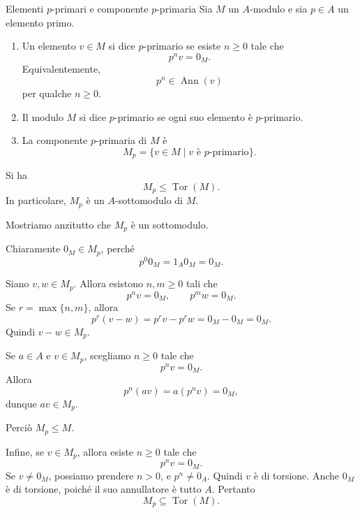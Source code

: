 \documentclass[a4paper]{article}
\begin{document}
\begin{radioactive}
\begin{snippetdefinition}{Elementi \(p\)-primari e componente \(p\)-primaria}
    Sia \(M\) un \(A\)-modulo e sia \(p\in A\) un elemento primo.

    \begin{enumerate}
        \item Un elemento \(v\in M\) si dice \(p\)-primario se esiste \(n\geq 0\) tale che
        \[
            p^n v=0_M.
        \]
        Equivalentemente,
        \[
            p^n\in \operatorname{Ann}(v)
        \]
        per qualche \(n\geq 0\).

        \item Il modulo \(M\) si dice \(p\)-primario se ogni suo elemento è \(p\)-primario.

        \item La componente \(p\)-primaria di \(M\) è
        \[
            M_p
            =
            \{v\in M\mid v \text{ è } p\text{-primario}\}.
        \]
    \end{enumerate}
\end{snippetdefinition}
\end{radioactive}

\begin{radioactive}
\begin{snippetlemma}{}
    Si ha
    \[
        M_p\leq \operatorname{Tor}(M).
    \]
    In particolare, \(M_p\) è un \(A\)-sottomodulo di \(M\).
\end{snippetlemma}
\end{radioactive}

\begin{radioactive}
\begin{snippetproof}{}
    Mostriamo anzitutto che \(M_p\) è un sottomodulo.

    Chiaramente \(0_M\in M_p\), perché
    \[
        p^0 0_M=1_A0_M=0_M.
    \]

    Siano \(v,w\in M_p\). Allora esistono \(n,m\geq 0\) tali che
    \[
        p^n v=0_M,
        \qquad
        p^m w=0_M.
    \]
    Se \(r=\max\{n,m\}\), allora
    \[
        p^r(v-w)=p^rv-p^rw=0_M-0_M=0_M.
    \]
    Quindi \(v-w\in M_p\).

    Se \(a\in A\) e \(v\in M_p\), scegliamo \(n\geq 0\) tale che
    \[
        p^n v=0_M.
    \]
    Allora
    \[
        p^n(av)=a(p^n v)=0_M,
    \]
    dunque \(av\in M_p\).

    Perciò \(M_p\leq M\).

    Infine, se \(v\in M_p\), allora esiste \(n\geq 0\) tale che
    \[
        p^n v=0_M.
    \]
    Se \(v\neq 0_M\), possiamo prendere \(n>0\), e \(p^n\neq 0_A\). Quindi \(v\) è di torsione.
    Anche \(0_M\) è di torsione, poiché il suo annullatore è tutto \(A\). Pertanto
    \[
        M_p\subseteq \operatorname{Tor}(M).
    \]
\end{snippetproof}
\end{radioactive}
\end{document}
